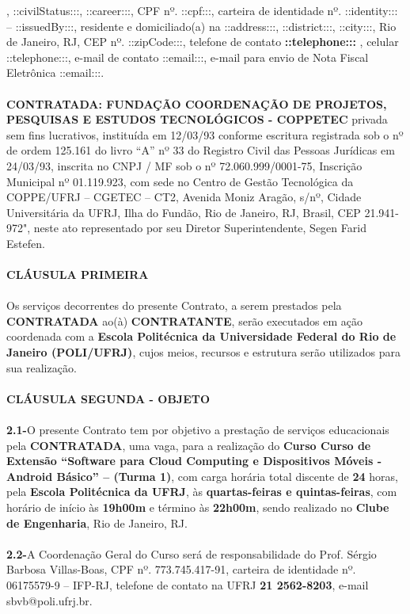 \documentclass[a4paper,7.5pt]{article}
\newcommand{\thecourse}{``Software para Cloud Computing e Dispositivos Móveis - Android Básico''}
\begin{document}
\fontsize{7.5}{9}\selectfont
\justifying
{}, ::civilStatus:::, ::career:::, CPF nº. ::cpf:::, carteira de identidade nº. ::identity::: – ::issuedBy:::, residente e domiciliado(a) na ::address:::, ::district:::, ::city:::, Rio de Janeiro, RJ, CEP nº.  ::zipCode:::, telefone de contato {\bf ::telephone::: }, celular ::telephone:::, e-mail de contato ::email:::, e-mail para envio de Nota Fiscal Eletrônica ::email:::.
\\\\
{\bf CONTRATADA: FUNDAÇÃO COORDENAÇÃO DE PROJETOS, PESQUISAS E ESTUDOS TECNOLÓGICOS - COPPETEC} privada sem fins lucrativos, instituída em 12/03/93 conforme escritura registrada sob o nº de ordem 125.161 do livro “A” nº 33 do Registro Civil das Pessoas Jurídicas em 24/03/93, inscrita no CNPJ / MF sob o nº 72.060.999/0001-75, Inscrição Municipal nº 01.119.923, com sede no Centro de Gestão Tecnológica da COPPE/UFRJ – CGETEC – CT2, Avenida Moniz Aragão, s/nº, Cidade Universitária da UFRJ, Ilha do Fundão, Rio de Janeiro, RJ, Brasil, CEP 21.941-972", neste ato representado por seu Diretor Superintendente, Segen Farid Estefen.
\\\\
{\bf CLÁUSULA PRIMEIRA}
\\\\
\indent Os serviços decorrentes do presente Contrato, a serem prestados pela {\bf CONTRATADA} ao(à) {\bf CONTRATANTE}, serão executados em ação coordenada com a {\bf Escola Politécnica da Universidade Federal do Rio de Janeiro (POLI/UFRJ)}, cujos meios, recursos e estrutura serão utilizados para sua realização.
\\\\
 {\bf CLÁUSULA SEGUNDA - OBJETO}
\\\\
{\bf 2.1-}\indent O presente Contrato tem por objetivo a prestação de serviços educacionais pela {\bf CONTRATADA}, uma vaga, para a realização do {\bf Curso Curso de Extensão \thecourse{}  – (Turma 1)}, com carga horária total discente de {\bf 24} horas, pela {\bf Escola Politécnica da UFRJ}, às {\bf quartas-feiras e quintas-feiras}, com horário de início às {\bf 19h00m} e término às {\bf22h00m}, sendo realizado no {\bf Clube de Engenharia}, Rio de Janeiro, RJ.
\\\\
{\bf2.2-}\indent A Coordenação Geral do Curso será de responsabilidade do Prof. Sérgio Barbosa Villas-Boas, CPF nº. 773.745.417-91, carteira de identidade nº. 06175579-9 – IFP-RJ, telefone de contato na UFRJ {\bf 21 2562-8203}, e-mail sbvb@poli.ufrj.br.
\end{document}

